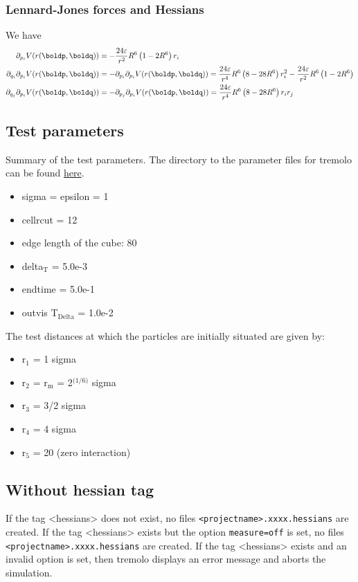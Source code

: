 \documentclass[11pt]{article}
\begin{document}
\subsubsection{Lennard-Jones forces and Hessians}
\label{sec-1-1-3}
We have
\begin{align}
  \partial_{p_i} V(r(\boldp, \boldq)) &= - \frac{24 \varepsilon}{r^2} R^6 \left(1 - 2 R^6\right)r_i \\
  \partial_{q_i}\partial_{p_i} V(r(\boldp, \boldq)) &= - \partial_{p_i}\partial_{p_i} V(r(\boldp, \boldq)) = \frac{24 \varepsilon}{r^4} R^6 \left(8 - 28 R^6\right)r_i^2 - \frac{24 \varepsilon}{r^2} R^6 \left(1 - 2 R^6\right) \\
  \partial_{q_j}\partial_{p_i} V(r(\boldp, \boldq)) &= - \partial_{p_j}\partial_{p_i} V(r(\boldp, \boldq)) = \frac{24 \varepsilon}{r^4} R^6 \left(8 - 28 R^6\right)r_ir_j
\end{align}

\subsection{Test parameters}
\label{sec-1-2}
Summary of the test parameters. The directory to the parameter files for tremolo can be found \href{file:///home/huber/Sandbox/testHessians/}{here}.
\begin{itemize}
\item sigma = epsilon = 1
\item cellrcut = 12
\item edge length of the cube: 80
\item delta$_{\text{T}}$ = 5.0e-3
\item endtime = 5.0e-1
\item outvis T$_{\text{Delta}}$ = 1.0e-2
\end{itemize}
The test distances at which the particles are initially situated are given by:
\begin{itemize}
\item r$_{\text{1}}$ = 1 sigma
\item r$_{\text{2}}$ = r$_{\text{m}}$ = 2$^{\text{(1/6)}}$ sigma
\item r$_{\text{3}}$ = 3/2 sigma
\item r$_{\text{4}}$ = 4 sigma
\item r$_{\text{5}}$ = 20 (zero interaction)
\end{itemize}

\subsection{Without hessian tag}
\label{sec-1-3}
If the tag <hessians> does not exist, no files \texttt{<projectname>.xxxx.hessians} are created.
If the tag <hessians> exists but the option \texttt{measure=off} is set, no files \texttt{<projectname>.xxxx.hessians} are created.
If the tag <hessians> exists and an invalid option is set, then tremolo displays an error message and aborts the simulation.
\end{document}
